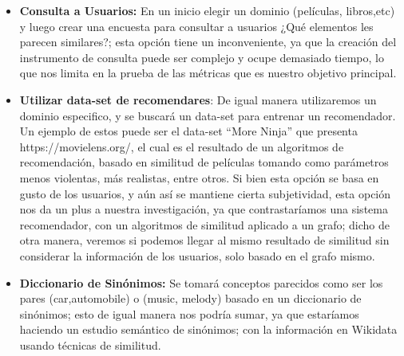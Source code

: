 \begin{itemize}
\item \textbf{Consulta a Usuarios:} En un inicio elegir un dominio (películas, libros,etc) y luego crear una encuesta para consultar a usuarios ¿Qué elementos les parecen similares?; esta opción tiene un inconveniente, ya  que la creación del instrumento de consulta puede ser complejo y ocupe demasiado tiempo, lo que nos limita en la prueba de las métricas que es nuestro objetivo principal.  
\item \textbf{Utilizar data-set de recomendares}: De igual manera utilizaremos un dominio especifico, y se buscará un data-set para entrenar un recomendador. Un ejemplo de estos puede ser el data-set “More Ninja” que presenta https://movielens.org/, el cual es el resultado de un algoritmos de recomendación, basado en similitud de películas tomando como parámetros menos violentas, más realistas, entre otros.
Si bien esta opción se basa en gusto de los usuarios, y aún así se mantiene cierta
subjetividad, esta opción nos da un plus a nuestra investigación, ya que contrastaríamos una sistema recomendador, con un algoritmos de similitud aplicado a un grafo; dicho de otra manera, veremos si podemos llegar al mismo resultado de similitud sin considerar la información de los usuarios, solo basado en el grafo mismo.
\item \textbf{Diccionario de Sinónimos:} Se tomará conceptos parecidos como ser los pares (car,automobile) o (music, melody)  basado en un diccionario de sinónimos; esto de igual manera nos podría sumar, ya que estaríamos haciendo un estudio semántico de sinónimos; con la información en Wikidata usando técnicas de similitud.
\end{itemize}